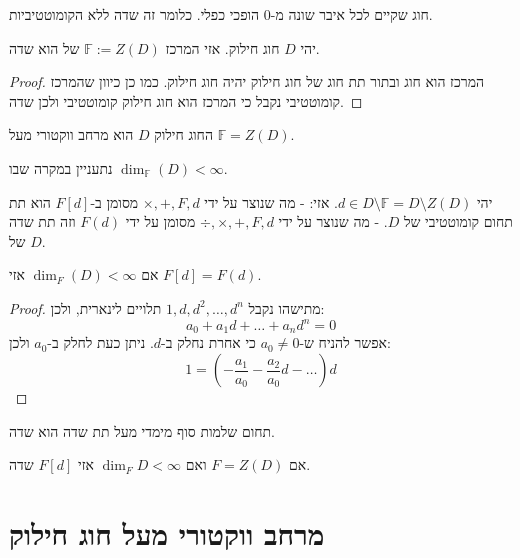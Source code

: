 \documentclass{tstextbook}
\begin{document}
\begin{definition}
חוג שקיים לכל איבר שונה מ-0 הופכי כפלי. כלומר זה שדה ללא הקומוטטיביות.

\end{definition}
\begin{proposition}
יהי \(D\) חוג חילוק. אזי המרכז \(\mathbb{F}:= Z(D)\) של הוא שדה.

\end{proposition}
\begin{proof}
המרכז הוא חוג ובתור תת חוג של חוג חילוק יהיה חוג חילוק. כמו כן כיוון שהמרכז קומוטטיבי נקבל כי המרכז הוא חוג חילוק קומוטטיבי ולכן שדה.

\end{proof}
\begin{proposition}
החוג חילוק \(D\) הוא מרחב ווקטורי מעל \(\mathbb{F}=Z(D)\).

\end{proposition}
\begin{remark}
נתעניין במקרה שבו \(\dim_{\mathbb{F}}(D)<\infty\).

\end{remark}
\begin{definition}
יהי \(d \in D \setminus \mathbb{F}=D\setminus Z(D)\). אזי:
- מה שנוצר על ידי \(\times,+,F,d\) מסומן ב-\(F[d]\) הוא תת תחום קומוטטיבי של \(D\).
- מה שנוצר על ידי \(\div, \times, +, F,d\) מסומן על ידי \(F(d)\) וזה תת שדה של \(D\).

\end{definition}
\begin{proposition}
אם \(\dim_{F}(D)<\infty\) אזי \(F[d]=F(d)\).

\end{proposition}
\begin{proof}
מתישהו נקבל \(1,d,d^{2},\dots,d^{n}\) תלויים לינארית, ולכן:
$$a_{0}+a_{1}d+\dots+a_{n}d^{n}=0$$
אפשר להניח ש-\(a_{0} \neq 0\) כי אחרת נחלק ב-\(d\). ניתן כעת לחלק ב-\(a_{0}\) ולכן:
$$1=\left( -\frac{a_{1}}{a_{0}}-\frac{a_{2}}{a_{0}}d-\dots \right)d$$

\end{proof}
\begin{proposition}
תחום שלמות סוף מימדי מעל תת שדה הוא שדה.

\end{proposition}
\begin{proposition}
אם \(F=Z(D)\) ואם \(\dim_{F}D<\infty\) אזי \(F[d]\) שדה.

\end{proposition}
\section{מרחב ווקטורי מעל חוג חילוק}
\end{document}
